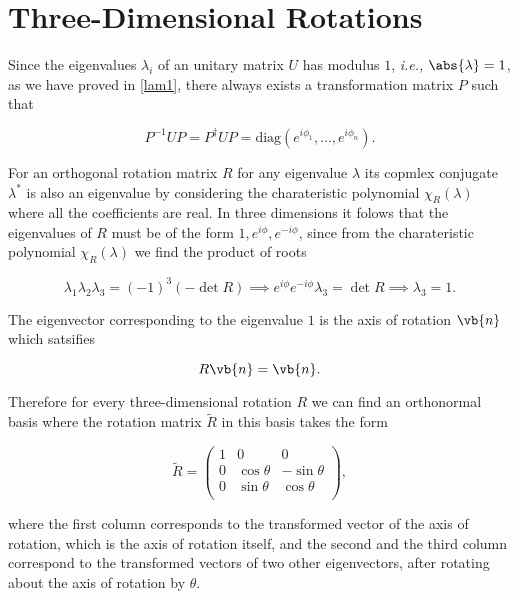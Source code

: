\documentclass[a4paper,12pt]{report}
\begin{document}
\section{Three-Dimensional Rotations}

Since the eigenvalues \(\lambda _{i} \) of an unitary matrix \(U\) has modulus \(1\), \textit{i.e.,} \(\abs{\lambda } = 1\), as we have proved in \cref{lam1}, there always exists a transformation matrix \(P\) such that 

\begin{equation}
    P^{-1} UP = P^{\dagger} UP = \text{diag}(e^{i \phi _{1} }, \ldots , e^{i \phi _{n} }  ). 
\end{equation}

For an orthogonal rotation matrix \(R\) for any eigenvalue \(\lambda \) its copmlex conjugate \(\lambda ^*\) is also an eigenvalue by considering the charateristic polynomial \(\chi _{R}(\lambda ) \) where all the coefficients are real. In three dimensions it folows that the eigenvalues of \(R\) must be of the form \(1, e^{i \phi }, e^{-i \phi }  \), since from the charateristic polynomial \(\chi _{R}(\lambda ) \) we find the product of roots 

\begin{equation}
    \lambda _{1}\lambda _{2}\lambda _{3} = (-1)^3(-\det R) \implies e^{i \phi }e^{-i \phi }\lambda _{3} = \det R \implies \lambda _{3} = 1.       
\end{equation}

The eigenvector corresponding to the eigenvalue \(1\) is the axis of rotation \(\vb{n} \) which satsifies 

\begin{equation}
    R\vb{n} = \vb{n}.
\end{equation}

Therefore for every three-dimensional rotation \(R\) we can find an orthonormal basis where the rotation matrix \(\tilde{R} \) in this basis takes the form 

\begin{equation}
    \tilde{R} = \begin{pmatrix}
        1 & 0 &  0 \\
        0 & \cos \theta  & -\sin \theta   \\
        0 & \sin \theta  &  \cos \theta  \\
    \end{pmatrix},
\end{equation}

where the first column corresponds to the transformed vector of the axis of rotation, which is the axis of rotation itself, and the second and the third column correspond to the transformed vectors of two other eigenvectors, after rotating about the axis of rotation by \(\theta \). 
\end{document}
